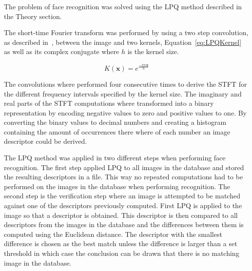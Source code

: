 The problem of face recognition was solved using the LPQ method described in the Theory section.

The short-time Fourier transform was performed by using a two step convolution, as described in~\cite{LPQ:1996}, between the image and two kernels, Equation~\ref{eq:LPQKernel} as well as its complex conjugate where \(h\) is the kernel size.

\begin{equation}
  K(\mathbf{x}) = e^{\frac{-2 \pi i \mathbf{x}}{h}}
\label{eq:LPQKernel}
\end{equation}

The convolutions where performed four consecutive times to derive the STFT
for the different frequency intervals specified by the kernel size. The imaginary and real parts of the STFT computations where transformed into a binary representation by encoding negative values to zero and positive values to one. By converting the binary values to decimal numbers and creating a histogram containing the amount of occurrences there where of each number an image descriptor could be derived.

The LPQ method was applied in two different steps when performing face recognition. The first step applied LPQ to all images in the database and stored the resulting descriptors in a file. This way no repeated computations had to be performed on the images in the database when performing recognition. The second step is the verification step where an image is attempted to be matched against one of the descriptors previously computed. First LPQ is applied to the image so that a descriptor is obtained. This descriptor is then compared to all descriptors from the images in the database and the differences between them is computed using the Euclidean distance. The descriptor with the smallest difference is chosen as the best match unless the difference is larger than a set threshold in which case the conclusion can be drawn that there is no matching image in the database.
